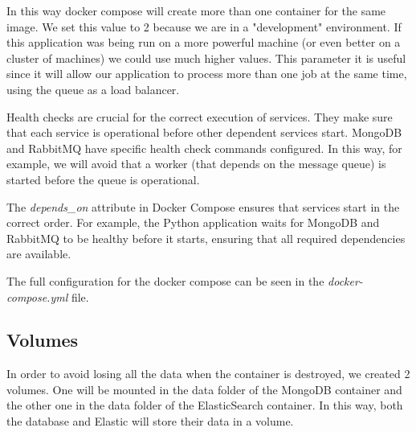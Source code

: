 In this way docker compose will create more than one container for the same
image. We set this value to 2 because we are in a "development" environment.
If this application was being run on a more powerful machine (or even better
on a cluster of machines) we could use much higher values.
This parameter it is useful since it will allow our application to process more
than one job at the same time, using the queue as a load balancer.

Health checks are crucial for the correct execution of services. They make sure
that each service is operational before other dependent services start. MongoDB and
RabbitMQ have specific health check commands configured.
In this way, for example, we will avoid that a worker (that depends on the message
queue) is started before the queue is operational.

The \textit{depends\_on} attribute in Docker Compose ensures that services start
in the correct order. For example, the Python application waits for MongoDB and
RabbitMQ to be healthy before it starts, ensuring that all required
dependencies are available.

The full configuration for the docker compose can be seen in the
\textit{docker-compose.yml} file.

\subsection{Volumes}
In order to avoid losing all the data when the container is destroyed, we created
2 volumes. One will be mounted in the data folder of the MongoDB container and
the other one in the data folder of the ElasticSearch container. In this way,
both the database and Elastic will store their data in a volume.
